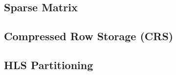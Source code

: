 \subsection{Sparse Matrix}


\subsection{Compressed Row Storage (CRS)}


\subsection{HLS Partitioning}

